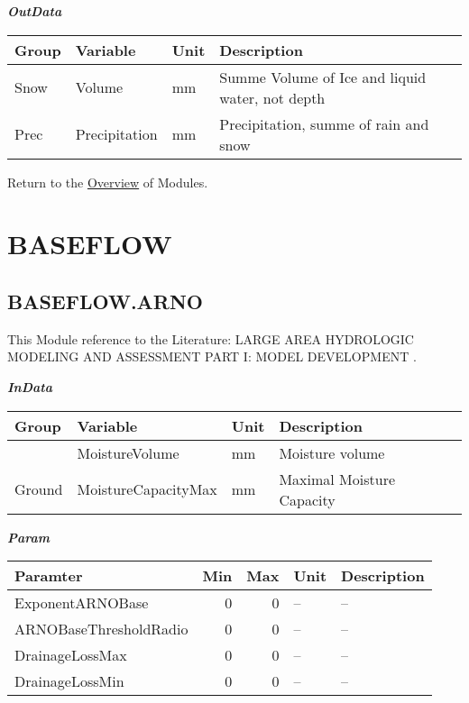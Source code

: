 \documentclass[
]{book}
\begin{document}
\textbf{\emph{OutData}}

\begin{table}[!h]
\centering
\begin{tabular}{l|l|l|l}
\hline
Group & Variable & Unit & Description\\
\hline
Snow & Volume & mm & Summe Volume of Ice and liquid water, not depth\\
\cline{1-4}
Prec & Precipitation & mm & Precipitation, summe of rain and snow\\
\hline
\end{tabular}
\end{table}

Return to the \protect\hyperlink{module}{Overview} of Modules.

\hypertarget{BASEFLOW}{%
\section{BASEFLOW}\label{BASEFLOW}}

\hypertarget{BASEFLOW.ARNO}{%
\subsection{BASEFLOW.ARNO}\label{BASEFLOW.ARNO}}

This Module reference to the Literature: LARGE AREA HYDROLOGIC MODELING AND ASSESSMENT PART I: MODEL DEVELOPMENT \citep{Arnold.1998}.

\textbf{\emph{InData}}

\begin{table}[!h]
\centering
\begin{tabular}{l|l|l|l}
\hline
Group & Variable & Unit & Description\\
\hline
 & MoistureVolume & mm & Moisture volume\\
\cline{2-4}
\multirow{-2}{*}{\raggedright\arraybackslash Ground} & MoistureCapacityMax & mm & Maximal Moisture Capacity\\
\hline
\end{tabular}
\end{table}

\textbf{\emph{Param}}

\begin{table}[!h]
\centering
\begin{tabular}{l|r|r|l|l}
\hline
Paramter & Min & Max & Unit & Description\\
\hline
ExponentARNOBase & 0 & 0 & -- & --\\
\cline{1-5}
ARNOBaseThresholdRadio & 0 & 0 & -- & --\\
\cline{1-5}
DrainageLossMax & 0 & 0 & -- & --\\
\cline{1-5}
DrainageLossMin & 0 & 0 & -- & --\\
\hline
\end{tabular}
\end{table}
\end{document}
